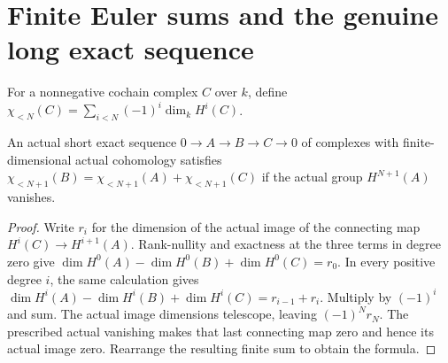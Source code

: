 \section{Finite Euler sums and the genuine long exact sequence}

\begin{definition}
\label{def:fc-cohomology-finite-euler}
\leanok
{}
For a nonnegative cochain complex $C$ over $k$, define
$\chi_{<N}(C)=\sum_{i<N}(-1)^i\dim_k H^i(C)$.
\end{definition}

\begin{theorem}
\label{thm:fc-cohomology-finite-euler}
\leanok
{}
An actual short exact sequence $0\to A\to B\to C\to0$ of complexes
with finite-dimensional actual cohomology satisfies
$\chi_{<N+1}(B)=\chi_{<N+1}(A)+\chi_{<N+1}(C)$ if the actual group
$H^{N+1}(A)$ vanishes.
\end{theorem}
\begin{proof}
Write $r_i$ for the dimension of the actual image of the connecting
map $H^i(C)\to H^{i+1}(A)$. Rank-nullity and exactness at the three
terms in degree zero give
$\dim H^0(A)-\dim H^0(B)+\dim H^0(C)=r_0$.
In every positive degree $i$, the same calculation gives
$\dim H^i(A)-\dim H^i(B)+\dim H^i(C)=r_{i-1}+r_i$.
Multiply by $(-1)^i$ and sum. The actual image dimensions telescope,
leaving $(-1)^N r_N$. The prescribed actual vanishing makes that
last connecting map zero and hence its actual image zero. Rearrange
the resulting finite sum to obtain the formula.
\end{proof}
